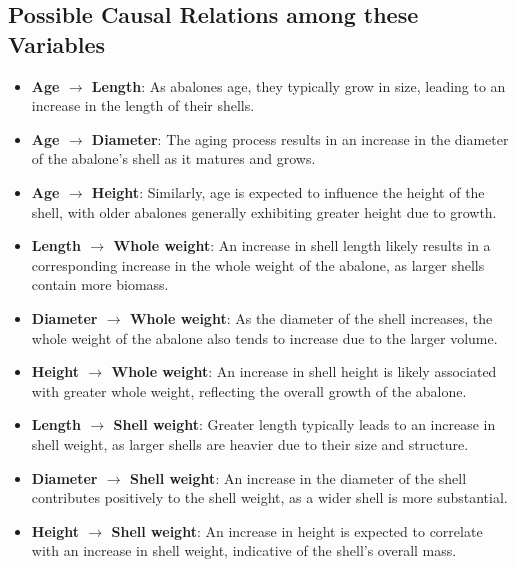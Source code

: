 \documentclass{article}
\begin{document}
\subsection{Possible Causal Relations among these Variables}

\begin{minipage}[t]{0.7\linewidth}
\begin{itemize}
    \item \textbf{Age $\rightarrow$ Length}: As abalones age, they typically grow in size, leading to an increase in the length of their shells.
    
    \item \textbf{Age $\rightarrow$ Diameter}: The aging process results in an increase in the diameter of the abalone's shell as it matures and grows.
    
    \item \textbf{Age $\rightarrow$ Height}: Similarly, age is expected to influence the height of the shell, with older abalones generally exhibiting greater height due to growth.
    
    \item \textbf{Length $\rightarrow$ Whole weight}: An increase in shell length likely results in a corresponding increase in the whole weight of the abalone, as larger shells contain more biomass.
    
    \item \textbf{Diameter $\rightarrow$ Whole weight}: As the diameter of the shell increases, the whole weight of the abalone also tends to increase due to the larger volume.
    
    \item \textbf{Height $\rightarrow$ Whole weight}: An increase in shell height is likely associated with greater whole weight, reflecting the overall growth of the abalone.
    
    \item \textbf{Length $\rightarrow$ Shell weight}: Greater length typically leads to an increase in shell weight, as larger shells are heavier due to their size and structure.
    
    \item \textbf{Diameter $\rightarrow$ Shell weight}: An increase in the diameter of the shell contributes positively to the shell weight, as a wider shell is more substantial.
    
    \item \textbf{Height $\rightarrow$ Shell weight}: An increase in height is expected to correlate with an increase in shell weight, indicative of the shell's overall mass.
    

\end{itemize}
\end{minipage}
\end{document}
